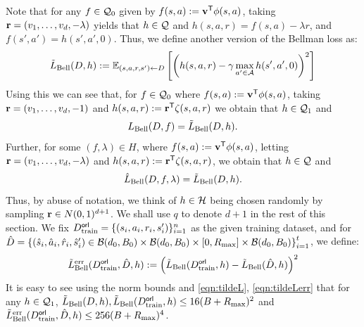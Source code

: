 Note that for any $f \in \mathcal{Q}_0$ given by $f(s,a) := {\mathbf{v}}^{\sf T}\phi(s,a)$, taking ${\mathbf{r}} = (v_1, \dots, v_d, -\lambda)$ yields that $h \in \mathcal{Q}$ and $h(s,a,r) = f(s,a) - \lambda r$, and $f(s',a') = h(s',a',0)$. Thus, we define another version of the Bellman loss as:
\begin{equation}
    \tilde{L}_{\textnormal{Bell}}(D, h) := \mathbb{E}_{(s, a, r, s') \leftarrow D}\left[\left(h(s, a,r) - \gamma \max_{a' \in \mathcal{A}} h(s',a',0)\right)^2\right] \label{eqn:tildeL}
\end{equation}
Using this we can see that, for $f \in \mathcal{Q}_0$ where $f(s,a) := {\mathbf{v}}^{\sf T}\phi(s,a)$, taking ${\mathbf{r}} = (v_1, \dots, v_d, -1)$ and $h(s,a,r) := {\mathbf{r}}^{\sf T}\zeta(s,a,r)$ we obtain that $h \in \mathcal{Q}_1$ and 
\begin{equation}
    L_{\textnormal{Bell}}(D, f) = \tilde{L}_{\textnormal{Bell}}(D, h). \label{eqn:LtildeL} 
\end{equation}
Further, for some $(f, \lambda) \in H$, where $f(s,a) := {\mathbf{v}}^{\sf T}\phi(s,a)$, letting ${\mathbf{r}} = (v_1, \dots, v_d, -\lambda)$ and $h(s,a,r) := {\mathbf{r}}^{\sf T}\zeta(s,a,r)$, we obtain that $h \in \mathcal{Q}$ and 
\begin{equation}
    \hat{L}_{\textnormal{Bell}}(D, f, \lambda) = \tilde{L}_{\textnormal{Bell}}(D, h). \label{eqn:hatLtildeL} 
\end{equation}
Thus, by abuse of notation, we think of $h \in \mathcal{H}$ being chosen randomly by sampling ${\mathbf{r}} \in N(0,1)^{d+1}$. We shall use $q$ to denote $d+1$ in the rest of this section.
We fix $D^{\sf orl}_{\textnormal{train}} = \{(s_i, a_i, r_i, s'_i)\}_{i=1}^n$ as the given training dataset, and for $\hat{D} = \left\{(\hat{s}_i, \hat{a}_i, \hat{r}_i, \hat{s}'_i) \in \mathcal{B}(d_0, B_0) \times \mathcal{B}(d_0, B_0)\times [0, R_{\textnormal{max}}] \times \mathcal{B}(d_0, B_0)\right\}_{i=1}^t$,
we  define:
\begin{equation}
    \tilde{L}^{\textnormal{err}}_{\textnormal{Bell}}(D^{\sf orl}_{\textnormal{train}},  \hat{D}, h) := \left(\tilde{L}_{\textnormal{Bell}}(D^{\sf orl}_{\textnormal{train}}, h) - \tilde{L}_{\textnormal{Bell}}(\hat{D}, h)\right)^2 \label{eqn:tildeLerr}
\end{equation}
It is easy to see using the norm bounds and \eqref{eqn:tildeL}, \eqref{eqn:tildeLerr} that for any $h \in \mathcal{Q}_1$, $\tilde{L}_{\textnormal{Bell}}(D, h), \tilde{L}_{\textnormal{Bell}}(D^{\sf orl}_{\textnormal{train}}, h) \leq 16 (B + R_{\textnormal{max}})^2$ and $\tilde{L}^{\textnormal{err}}_{\textnormal{Bell}}(D^{\sf orl}_{\textnormal{train}},  \hat{D}, h) \leq 256 (B + R_{\textnormal{max}})^4$.


